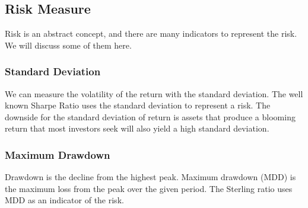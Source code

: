 \subsection{Risk Measure}
Risk is an abstract concept, and there are many indicators to represent the risk. We will discuss some of them here. 
\subsubsection{Standard Deviation}
We can measure the volatility of the return with the standard deviation. The well known Sharpe Ratio uses the standard deviation to represent a risk. The downside for the standard deviation of return is assets that produce a blooming return that most investors seek will also yield a high standard deviation.
\subsubsection{Maximum Drawdown}
Drawdown is the decline from the highest peak. Maximum drawdown (MDD) is the maximum loss from the peak over the given period. The Sterling ratio uses MDD as an indicator of the risk. 